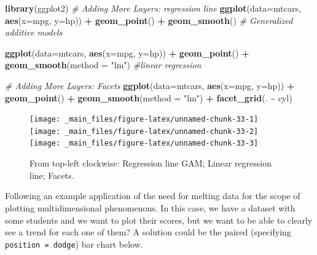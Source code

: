 \documentclass[
]{article}
\newenvironment{Shaded}{\begin{snugshade}}{\end{snugshade}}
\newcommand{\AttributeTok}[1]{\textcolor[rgb]{0.13,0.29,0.53}{#1}}
\newcommand{\CommentTok}[1]{\textcolor[rgb]{0.56,0.35,0.01}{\textit{#1}}}
\newcommand{\FunctionTok}[1]{\textcolor[rgb]{0.13,0.29,0.53}{\textbf{#1}}}
\newcommand{\NormalTok}[1]{#1}
\newcommand{\SpecialCharTok}[1]{\textcolor[rgb]{0.81,0.36,0.00}{\textbf{#1}}}
\newcommand{\StringTok}[1]{\textcolor[rgb]{0.31,0.60,0.02}{#1}}
\begin{document}
\begin{Shaded}
\begin{Highlighting}[]
\FunctionTok{library}\NormalTok{(ggplot2)}
\CommentTok{\# Adding More Layers: regression line}
\FunctionTok{ggplot}\NormalTok{(}\AttributeTok{data=}\NormalTok{mtcars, }\FunctionTok{aes}\NormalTok{(}\AttributeTok{x=}\NormalTok{mpg, }\AttributeTok{y=}\NormalTok{hp)) }\SpecialCharTok{+} 
  \FunctionTok{geom\_point}\NormalTok{() }\SpecialCharTok{+} 
  \FunctionTok{geom\_smooth}\NormalTok{() }\CommentTok{\# Generalized additive models}

\FunctionTok{ggplot}\NormalTok{(}\AttributeTok{data=}\NormalTok{mtcars, }\FunctionTok{aes}\NormalTok{(}\AttributeTok{x=}\NormalTok{mpg, }\AttributeTok{y=}\NormalTok{hp)) }\SpecialCharTok{+} 
  \FunctionTok{geom\_point}\NormalTok{() }\SpecialCharTok{+} 
  \FunctionTok{geom\_smooth}\NormalTok{(}\AttributeTok{method =} \StringTok{"lm"}\NormalTok{) }\CommentTok{\#linear regression}

\CommentTok{\# Adding More Layers: Facets}
\FunctionTok{ggplot}\NormalTok{(}\AttributeTok{data=}\NormalTok{mtcars, }\FunctionTok{aes}\NormalTok{(}\AttributeTok{x=}\NormalTok{mpg, }\AttributeTok{y=}\NormalTok{hp)) }\SpecialCharTok{+} 
  \FunctionTok{geom\_point}\NormalTok{() }\SpecialCharTok{+} 
  \FunctionTok{geom\_smooth}\NormalTok{(}\AttributeTok{method =} \StringTok{"lm"}\NormalTok{) }\SpecialCharTok{+} 
  \FunctionTok{facet\_grid}\NormalTok{(. }\SpecialCharTok{\textasciitilde{}}\NormalTok{ cyl)}
\end{Highlighting}
\end{Shaded}

\begin{figure}[H]
\texttt{[image: \_main\_files/figure-latex/unnamed-chunk-33-1]} \texttt{[image: \_main\_files/figure-latex/unnamed-chunk-33-2]} \texttt{[image: \_main\_files/figure-latex/unnamed-chunk-33-3]} \caption{From top-left clockwise: Regression line GAM; Linear regression line; Facets.}\label{fig:unnamed-chunk-33}
\end{figure}

Following an example application of the need for melting data for the
scope of plotting multidimensional phenomenons. In this case, we have a
dataset with some students and we want to plot their scores, but we want
to be able to clearly see a trend for each one of them? A solution could
be the paired (specifying \texttt{position\ =\ \textquotesingle{}dodge\textquotesingle{}}) bar chart below.
\end{document}
